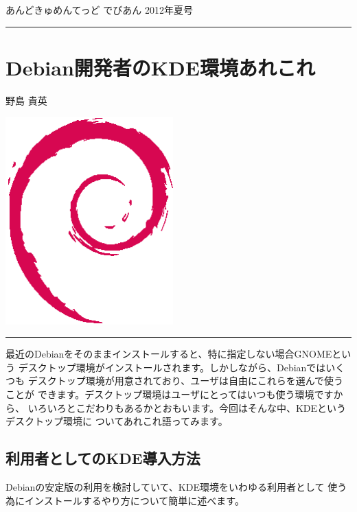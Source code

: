 \documentclass[mingoth,a4paper]{jsarticle}
\renewcommand{\dancersection}[2]{%
\newpage
あんどきゅめんてっど でびあん 2012年夏号
%
\vspace{0.1mm}\\
{\color{dancerdarkblue}\rule{\hsize}{2mm}}

%
%
\begin{minipage}[t]{0.6\hsize}
\color{dancerdarkblue}
\vspace{1cm}
\section{#1}
\hfill{}#2\\
\end{minipage}
\begin{minipage}[t]{0.4\hsize}
\vspace{-2cm}
\hfill{}\includegraphics[height=8cm]{image200502/openlogo-nd.eps}\\
\vspace{-5cm}
\end{minipage}
%
{\color{dancerlightblue}\rule{0.66\hsize}{2mm}}
%
\vspace{2cm}
}
\begin{document}
\clearpage

\dancersection{Debian開発者のKDE環境あれこれ}{野島 貴英}

最近のDebianをそのままインストールすると、特に指定しない場合GNOMEという
デスクトップ環境がインストールされます。しかしながら、Debianではいくつも
デスクトップ環境が用意されており、ユーザは自由にこれらを選んで使うことが
できます。デスクトップ環境はユーザにとってはいつも使う環境ですから、
いろいろとこだわりもあるかとおもいます。今回はそんな中、KDEというデスクトップ環境に
ついてあれこれ語ってみます。

\subsection{利用者としてのKDE導入方法}

Debianの安定版の利用を検討していて、KDE環境をいわゆる利用者として
使う為にインストールするやり方について簡単に述べます。
\end{document}
